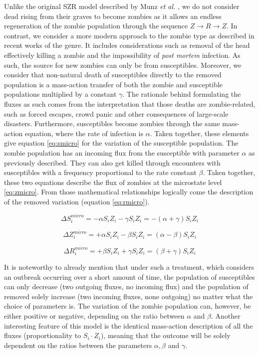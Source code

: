 \documentclass[11pt]{article} %
\begin{document}
Unlike the original SZR model described by Munz \textit{et al.} \cite{munz2009zombies}, we do not consider dead rising from their graves to become zombies as it allows an endless regeneration of the zombie population through the sequence $Z\rightarrow R\rightarrow Z$. In contrast, we consider a more modern approach to the zombie type as described in recent works of the genre. It includes considerations such as removal of the head effectively killing a zombie and the impossibility of \textit{post mortem} infection. As such, the source for new zombies can only be from susceptibles.  Moreover, we consider that non-natural death of susceptibles directly to the removed population is a mass-action transfer of both the zombie and susceptible populations multiplied by a constant $\gamma$. The rationale behind formulating the fluxes as such comes from the interpretation that those deaths are zombie-related, such as forced escapes, crowd panic and other consequences of large-scale disasters. Furthermore, susceptibles become zombies through the same mass-action equation, where the rate of infection is $\alpha$. Taken together, these elements give equation \eqref{eq:smicro} for the variation of the susceptible population. The zombie population has an incoming flux from the susceptible with parameter $\alpha$ as previously described. They can also get killed through encounters with susceptibles with a frequency proportional to the rate constant $\beta$. Taken together, these two equations describe the flux of zombies at the microstate level \eqref{eq:zmicro}. From those mathematical relationships logically come the description of the removed variation (equation \eqref{eq:rmicro}). 

\begin{equation}  \label{eq:smicro}
\Delta S_{i}^{micro} = -\alpha S_{i} Z_{i} -\gamma S_{i} Z_{i} = -(\alpha + \gamma) S_{i} Z_{i}
\end{equation}

\begin{equation} \label{eq:zmicro}
\Delta Z_{i}^{micro} = +\alpha S_{i} Z_{i} - \beta S_{i} Z_{i} = (\alpha - \beta) S_{i} Z_{i}
\end{equation}

\begin{equation} \label{eq:rmicro}
\Delta R_{i}^{micro} = +\beta S_{i} Z_{i} + \gamma S_{i} Z_{i} = (\beta + \gamma) S_{i} Z_{i}
\end{equation}
\bigskip

It is noteworthy to already mention that under such a treatment, which considers an outbreak occurring over a short amount of time, the population of susceptibles can only decrease (two outgoing fluxes, no incoming flux) and the population of removed solely increase (two incoming fluxes, none outgoing) no matter what the choice of parameters is. The variation of the zombie population can, however, be either positive or negative, depending on the ratio between $\alpha$ and $\beta$. Another interesting feature of this model is the identical mass-action description of all the fluxes (proportionality to $S_{i} \cdot Z_{i}$), meaning that the outcome will be solely dependent on the ratios between the parameters $\alpha, \beta$ and $\gamma$.
\end{document}
